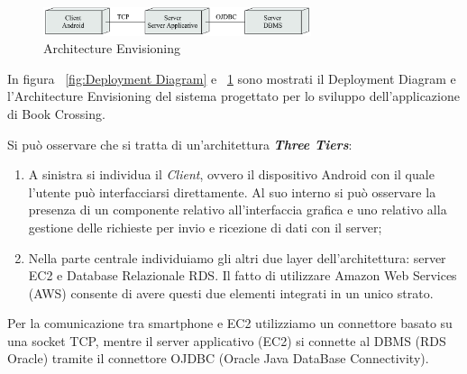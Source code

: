 
\begin{figure}[h]
	\centering
	\includegraphics[width=0.7\textwidth]{Immagini/Architecture_Envisoring}
	\caption{Architecture Envisioning}
	\label{fig:ArchitectureEnvisoring}
\end{figure}
\noindent
In figura ~\ref{fig:Deployment Diagram} e ~\ref{fig:ArchitectureEnvisoring} sono mostrati il Deployment Diagram e l'Architecture Envisioning del sistema progettato per lo sviluppo dell’applicazione di Book Crossing. 

Si può osservare che si tratta di un’architettura \textbf{\textit{Three Tiers}}:
\begin{enumerate}
	\item A sinistra si individua il \textit{Client}, ovvero il dispositivo Android con il quale l'utente può interfacciarsi direttamente. Al suo interno si può osservare la presenza di un componente relativo all’interfaccia grafica e uno relativo alla gestione delle richieste per invio e ricezione di dati con il server;
	\item Nella parte centrale individuiamo gli altri due layer dell’architettura: server EC2 e Database Relazionale RDS. Il fatto di utilizzare Amazon Web Services (AWS) consente di avere questi due elementi integrati in un unico strato.
\end{enumerate}
\noindent
Per la comunicazione tra smartphone e EC2 utilizziamo un connettore basato su una socket TCP, mentre il server applicativo (EC2) si connette al DBMS (RDS Oracle) tramite il connettore OJDBC (Oracle Java DataBase Connectivity). 